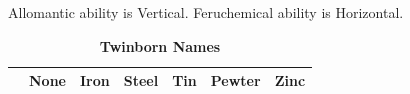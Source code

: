 \documentclass[conference]{IEEEtran}
\begin{document}
\newpage{}

\clearpage
\onecolumn


\begin{table}[h]
	
	\caption{\textbf{Twinborn Names}}
	Allomantic ability is Vertical.  Feruchemical ability is Horizontal.
	\begin{center}
	
	\begin{tabular}{|l |c |c |c |c |c |c | }
		\hline
		\cellcolor{black}&None&Iron&Steel&Tin&Pewter&Zinc\\\hline
		

\end{tabular}
\end{center}
\end{table}
\end{document}
